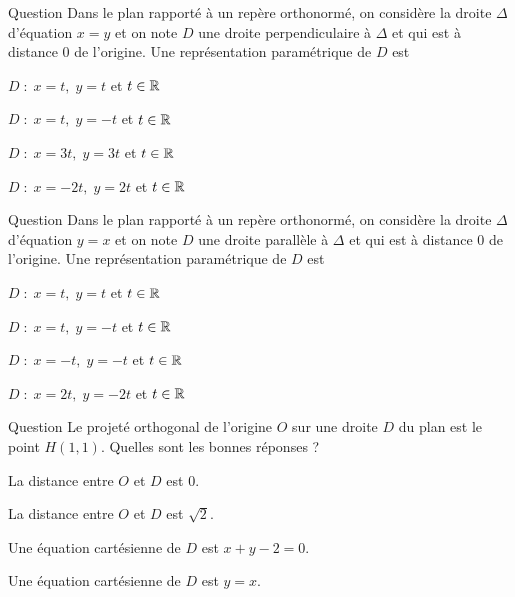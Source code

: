 \begin{multi}[multiple,feedback=
{Le vecteur \(\vec{n}=(1,-1)\) est normal à \(\Delta\), il dirige \(D\). Or \(\mbox{d}(O,D)=0\Rightarrow O\in D\). Donc \(D\) est la droite passant par \(O\) est dirigée par \(\vec{n}\).
}]{Question}
Dans le plan rapporté à un repère orthonormé, on considère la droite \(\Delta\) d'équation \(x=y\) et on note \(D\) une droite perpendiculaire à \(\Delta\) et qui est à distance \(0\) de l'origine. Une représentation paramétrique de \(D\) est

    \item \(D\; :\; x=t,\; y=t\) et \(t\in \mathbb{R}\)
    \item* \(D\; :\; x=t,\; y=-t\) et \(t\in \mathbb{R}\)
    \item \(D\; :\; x=3t,\; y=3t\) et \(t\in \mathbb{R}\)
    \item* \(D\; :\; x=-2t,\; y=2t\) et \(t\in \mathbb{R}\)
\end{multi}


\begin{multi}[multiple,feedback=
{Le vecteur \(\vec{n}=(1,-1)\) est normal à \(\Delta\), il est aussi normal à \(D\). Donc \(\vec{v}=(1,1)\) dirige \(D\). Or \(\mbox{d}(O,D)=0\Rightarrow O\in D\). Donc \(D\) est la droite passant par \(O\) est dirigée par \(\vec{v}\).
}]{Question}
Dans le plan rapporté à un repère orthonormé, on considère la droite \(\Delta\) d'équation \(y=x\) et on note \(D\) une droite parallèle à \(\Delta\) et qui est à distance \(0\) de l'origine. Une représentation paramétrique de \(D\) est

    \item* \(D\; :\; x=t,\; y=t\) et \(t\in \mathbb{R}\)
    \item \(D\; :\; x=t,\; y=-t\) et \(t\in \mathbb{R}\)
    \item* \(D\; :\; x=-t,\; y=-t\) et \(t\in \mathbb{R}\)
    \item \(D\; :\; x=2t,\; y=-2t\) et \(t\in \mathbb{R}\)
\end{multi}


\begin{multi}[multiple,feedback=
{\(D\) est la droite passant par \(H\) et \(\overrightarrow{OH}=(1,1)\) en est un vecteur normal.
}]{Question}
Le projeté orthogonal de l'origine \(O\) sur une droite \(D\) du plan est le point \(H(1,1)\). Quelles sont les bonnes réponses ?

    \item La distance entre \(O\) et \(D\) est \(0\).
    \item* La distance entre \(O\) et \(D\) est \(\sqrt{2}\).
    \item* Une équation cartésienne de \(D\) est \(x+y-2=0\).
    \item Une équation cartésienne de \(D\) est \(y=x\).
\end{multi}
